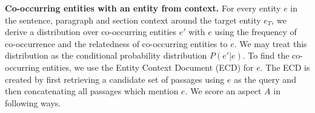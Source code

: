 \textbf{Co-occurring entities with an entity from context.}
For every entity $e$ in the sentence, paragraph and section context around the target entity $e_T$, we derive a distribution over co-occurring entities $e'$
with $e$ using the frequency of co-occurrence and the relatedness of co-occurring entities to $e$. We may treat this distribution as the conditional probability distribution $P(e' \vert e)$. To find the co-occurring entities, we use the Entity Context Document (ECD) \cite{chatterjee2019why} for $e$. The ECD is created by first retrieving a candidate set of passages using $e$ as the query and then concatenating all passages which mention $e$.
We score an aspect $A$ in following ways.


